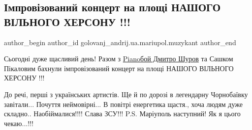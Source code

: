  
 
 
 
 
 
\subsection{Імпровізований концерт на площі НАШОГО ВІЛЬНОГО ХЕРСОНУ !!!}
\label{sec:18_11_2022.fb.golovanj_andrij.ua.mariupol.muzykant.1.koncert_herson}
 
\ifcmt
 author_begin
   author_id golovanj_andrij.ua.mariupol.muzykant
 author_end
\fi




Сьогодні дуже щасливий день! Разом з
\href{https://www.facebook.com/pianoboy.band}{Pianoбой Дмитро Шуров} та Сашком
Пікаловим бахнули імпровізований концерт на площі НАШОГО ВІЛЬНОГО ХЕРСОНУ !!!


До речі, перші з українських артистів. Ще й по дорозі в легендарну Чорнобаївку
завітали... Почуття неймовірні... В повітрі енергетика щастя., хоча людям дуже
складно.. Наобіймалися!!!! Слава ЗСУ!!! P.S. Маріуполь наступний! Як я цього
чекаю...!!!


